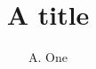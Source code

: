 \documentclass{amsart}

\title{A title}
\author{A. One}
\address{\begin{enumerate}\item\label{xa} First Institute, Lviv \item\label{xb} Second Institute, Kyiv\end{enumerate}}
\maketitle
Text, see \ref{xa} and \ref{xb}.

